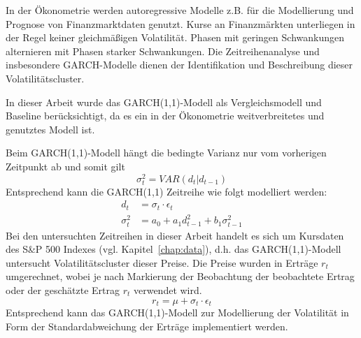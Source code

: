 \documentclass[ngerman]{ttlab-qualify}
\begin{document}
In der Ökonometrie werden autoregressive Modelle z.B. für die Modellierung und Prognose von Finanzmarktdaten genutzt. Kurse an Finanzmärkten unterliegen in der Regel keiner gleichmäßigen Volatilität. Phasen mit geringen Schwankungen alternieren mit Phasen starker Schwankungen. Die Zeitreihenanalyse und insbesondere GARCH-Modelle dienen der Identifikation und Beschreibung dieser Volatilitätscluster. 

In dieser Arbeit wurde das GARCH(1,1)-Modell als Vergleichsmodell und Baseline berücksichtigt, da es ein in der Ökonometrie weitverbreitetes und genutztes Modell ist.

Beim GARCH(1,1)-Modell hängt die bedingte Varianz nur vom vorherigen Zeitpunkt ab und somit gilt 
\[\sigma_t^2 = VAR(d_t|d_{t-1})\]
Entsprechend kann die GARCH(1,1) Zeitreihe wie folgt modelliert werden:
\begin{align}
d_t &= \sigma_t\cdot \epsilon_t \nonumber \\
\sigma_t^2 &= a_0 + a_1d_{t-1}^2 + b_1\sigma_{t-1}^2
\end{align} 
Bei den untersuchten Zeitreihen in dieser Arbeit handelt es sich um Kursdaten des S\&P 500 Indexes (vgl. Kapitel~\ref{chap:data}), d.h. das GARCH(1,1)-Modell untersucht Volatilitätscluster dieser Preise. Die Preise wurden in Erträge $r_t$ umgerechnet, wobei je nach Markierung der Beobachtung der beobachtete Ertrag oder der geschätzte Ertrag $r_t$ verwendet wird.
\[r_t = \mu +\sigma_t\cdot \epsilon_t\]
Entsprechend kann das GARCH(1,1)-Modell zur Modellierung der Volatilität in Form der Standardabweichung der Erträge implementiert werden.
\end{document}
